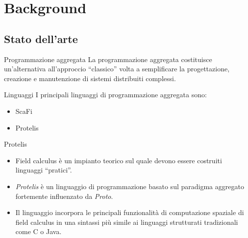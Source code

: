\section{Background}
    \subsection{Stato dell'arte}

    \begin{frame}{\insertsectionhead}{\insertsubsectionhead}

      \begin{block}{Programmazione aggregata} %
        La programmazione aggregata costituisce un'alternativa all'approccio ``classico'' volta a semplificare la progettazione, creazione e manutenzione di sistemi distribuiti complessi.
      \end{block}

      \pause

      \begin{block}{Linguaggi} %
        I principali linguaggi di programmazione aggregata sono:

        \begin{itemize}[<+(1)->]
          \item ScaFi
          \item Protelis
        \end{itemize}
      \end{block}

    \end{frame}

    \begin{frame}{\insertsectionhead}{\insertsubsectionhead}


      \begin{block}{Protelis}
        \begin{itemize}[<+->]
          \item Field calculus è un impianto teorico sul quale devono essere costruiti linguaggi ``pratici''.
          \item \emph{Protelis} è un linguaggio di programmazione basato sul paradigma aggregato fortemente influenzato da \emph{Proto}.
          \item Il linguaggio incorpora le principali funzionalità di computazione spaziale di field calculus in una sintassi più simile ai linguaggi strutturati tradizionali come C o Java.
        \end{itemize}
      \end{block}
    \end{frame}

